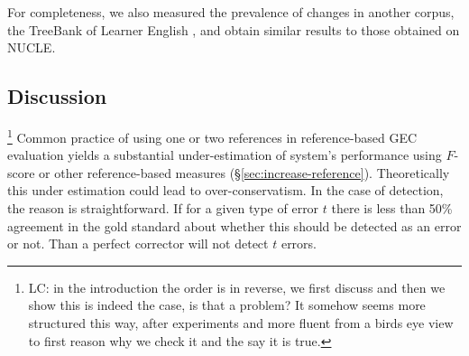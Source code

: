 \documentclass[letter,11pt]{article}
\newcommand{\lc}[1]{\footnote{\color{blue}LC: #1}}
\begin{document}
For completeness, we also measured the prevalence of changes in
another corpus, the TreeBank of Learner English \cite{yannakoudakis2011new},
and obtain  similar results to those obtained on NUCLE.
\subsection{Discussion}
{\label{subsec:low_coverage_over_conservatism}\color{red}
	\lc{in the introduction the order is in reverse, we first discuss and then we show this is indeed the case, is that a problem? It somehow seems more structured this way, after experiments and more fluent from a birds eye view to first reason why we check it and the say it is true.}
	 Common practice of using one or two references in reference-based GEC evaluation yields a substantial under-estimation of system's performance using $F$-score \cite{bryant2015far} or other reference-based measures (\S\ref{sec:increase-reference}).
	 Theoretically this under estimation could lead to over-conservatism. In the case of detection, the reason is straightforward. If for a given type of error $t$ there is less than 50\% agreement in the gold standard about whether this should be detected as an error or not. Than a perfect corrector will not detect $t$ errors.
	 
}
\end{document}
